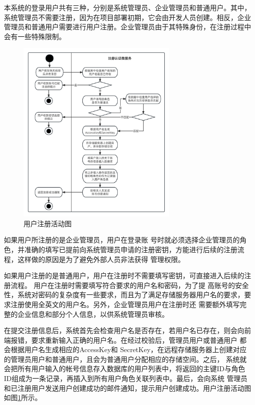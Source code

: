 本系统的登录用户共有三种，分别是系统管理员、企业管理员和普通用户。其中，系统管理员不需要注册，因为在项目部署初期，它会由开发人员创建。相反，企业管理员和普通用户需要进行用户注册。企业管理员由于其特殊身份，在注册过程中会有一些特殊限制。
\begin{figure}[h]
    \centering
    \includegraphics[width=0.7\textwidth]{my_figures/chapter4/用户注册活动图.png}
    \caption{用户注册活动图}
    \label{fig:用户注册活动图}
\end{figure}

如果用户所注册的是企业管理员，用户在登录账
号时就必须选择企业管理员的角色，并准确的填写已提前向系统管理员申请的注册密钥，方能进行后续的注册流程，这样做的原因是为了避免外部人员非法获得
管理权限。

如果用户注册的是普通用户，用户在注册时不需要填写密钥，可直接进入后续的注册流程。
用户在注册时需要填写符合要求的用户名和密码，为了提
高账号的安全性，系统对密码的复杂度有一些要求，而且为了满足存储服务器用户名的要求，要求注册使用全英文的用户名。另外，企业管理员用户在注册时还
需要额外填写完整的企业信息和部分个人信息，以供系统管理员审核。


在提交注册信息后，系统首先会检查用户名是否存在，若用户名已存在，则会向前端报错，要求重新输入正确的用户名。在经过校验后，管理员用户或普通用户
都会根据用户名生成相应的AccessKey和 SecretKey，在远程存储服务器上创建对应的管理员用户和普通用户，且会为普通用户分配相应的存储空间。之后，
系统就会把所有用户输入的帐号信息存入数据库的用户列表中，将返回的主键ID与角色ID组成为一条记录，再插入到所有用户角色关联列表中。最后，会向系统
管理员和已注册用户发送用户创建成功的邮件通知，提示用户创建成功。用户注册活动图如图\ref{fig:用户注册活动图}所示。

